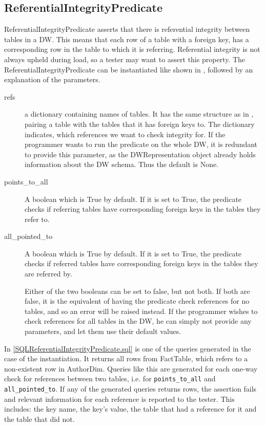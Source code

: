 \subsection{ReferentialIntegrityPredicate}
ReferentialIntegrityPredicate asserts that there is referential integrity between tables in a DW. This means that each row of a table with a foreign key, has a corresponding row in the table to which it is referring. Referential integrity is not always upheld during load, so a tester may want to assert this property. The ReferentialIntegrityPredicate can be instantiated like shown in , followed by an explanation of the parameters.


\begin{description}
\item [refs] a dictionary containing names of tables. It has the same structure as in , pairing a table with the tables that it has foreign keys to. The dictionary indicates, which references we want to check integrity for.  If the programmer wants to run the predicate on the whole DW, it is redundant to provide this parameter, as the DWRepresentation object already holds information about the DW schema. Thus the default is None.
\item [points\_to\_all] A boolean which is True by default. If it is set to True, the predicate checks if referring tables have corresponding foreign keys in the tables they refer to.
\item [all\_pointed\_to] A boolean which is True by default. If it is set to True, the predicate checks if referred tables have corresponding foreign keys in the tables they are referred by.

Either of the two booleans can be set to false, but not both. If both are false, it is the equivalent of having the predicate check references for no tables, and so an error will be raised instead. If the programmer wishes to check references for all tables in the DW, he can simply not provide any parameters, and let them use their default values.
\end{description}

In \cref{SQLReferentialIntegrityPredicate.sql} is one of the queries generated in the case of the instantiation. It returns all rows from FactTable, which refers to a non-existent row in AuthorDim. Queries like this are generated for each one-way check for references between two tables, i.e. for \texttt{points\_to\_all} and \texttt{all\_pointed\_to}. If any of the generated queries returns rows, the assertion fails and relevant information for each reference is reported to the tester. This includes: the key name, the key's value, the table that had a reference for it and the table that did not.

